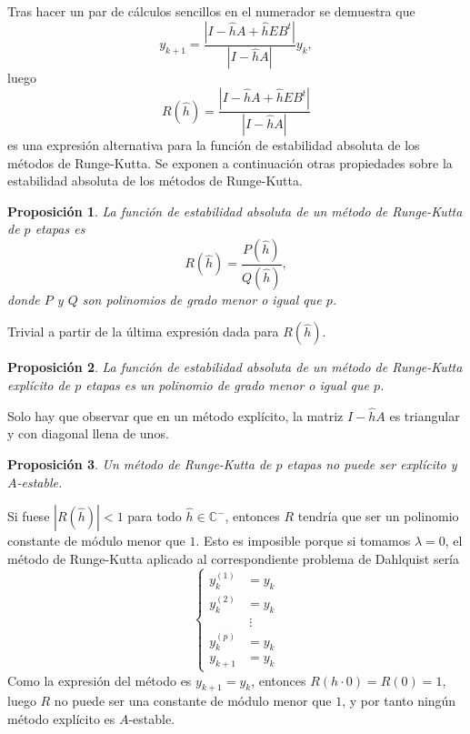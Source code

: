 \documentclass[11pt]{report}
\makeatletter
\renewenvironment{proof}[1][\proofname]{\par
  \pushQED{\qed}%
  \normalfont \topsep\z@skip %
  \trivlist
  \item[\hskip\labelsep
        \itshape
    #1\@addpunct{.}]\ignorespaces
}{%
  \popQED\endtrivlist\@endpefalse
}
\theoremstyle{mytheorem}
\newtheorem{proposition}{Proposición}
\theoremstyle{mydefinition}
\theoremstyle{myexample}
\let\oldproofname=\proofname
\renewcommand{\proofname}{\rm\bf{\oldproofname}}}
\newenvironment{cproposition} %
  {\begin{mdframed}[
        linewidth=3pt,
        linecolor=c2,
        bottomline=false,
        topline=false,
        rightline=false,
        innerrightmargin=0pt,
        innertopmargin=0pt,
        innerbottommargin=0pt,
        innerleftmargin=1em, %
        skipabove=\baselineskip]
    \begin{proposition}}
  {\end{proposition}\end{mdframed}}
\newcommand{\C}{\mathbb C}
\makeatother
\begin{document}
Tras hacer un par de cálculos sencillos en el numerador se demuestra que
\[y_{k+1} = \frac{\left|I-\hat{h}A+\hat{h}EB^t\right|}{\left|I-\hat{h}A\right|}y_k,\]
luego
\[R(\hat{h}) =\frac{\left|I-\hat{h}A+\hat{h}EB^t\right|}{\left|I-\hat{h}A\right|} \]
es una expresión alternativa para la función de estabilidad absoluta de los métodos de Runge-Kutta. Se exponen a continuación otras propiedades sobre la estabilidad absoluta de los métodos de Runge-Kutta.

\begin{cproposition}
La función de estabilidad absoluta de un método de Runge-Kutta de $p$ etapas es
\[R(\hat{h}) = \frac{P(\hat{h})}{Q(\hat{h})},\] donde $P$ y $Q$ son polinomios de grado menor o igual que $p$.
\end{cproposition}

\begin{proof}
    Trivial a partir de la última expresión dada para $R(\hat{h})$.
\end{proof}

\begin{cproposition}
La función de estabilidad absoluta de un método de Runge-Kutta explícito de $p$ etapas es un polinomio de grado menor o igual que $p$.
\end{cproposition}

\begin{proof}
    Solo hay que observar que en un método explícito, la matriz $I-\hat{h}A$ es triangular y con diagonal llena de unos.
\end{proof}

\begin{cproposition}
    Un método de Runge-Kutta de $p$ etapas no puede ser explícito y $A$-estable.
\end{cproposition}

\begin{proof}
    Si fuese $|R(\hat{h})| < 1$ para todo $\hat{h} \in \C^-$, entonces $R$ tendría que ser un polinomio constante de módulo menor que $1$. Esto es imposible porque si tomamos $\lambda = 0$, el método de Runge-Kutta aplicado al correspondiente problema de Dahlquist sería
    \[\left\{\begin{alignedat}{1}
    y_k^{(1)} &= y_k\\
    y_k^{(2)} &= y_k \\
    &\phantom{\vdots} \vdots \\
    y_k^{(p)} &= y_k \\
    y_{k+1} &= y_k
\end{alignedat}\right.\]
Como la expresión del método es $y_{k+1} = y_k$, entonces $R(h \cdot 0) = R(0) = 1$, luego $R$ no puede ser una constante de módulo menor que $1$, y por tanto ningún método explícito es $A$-estable.
\end{proof}
\end{document}
